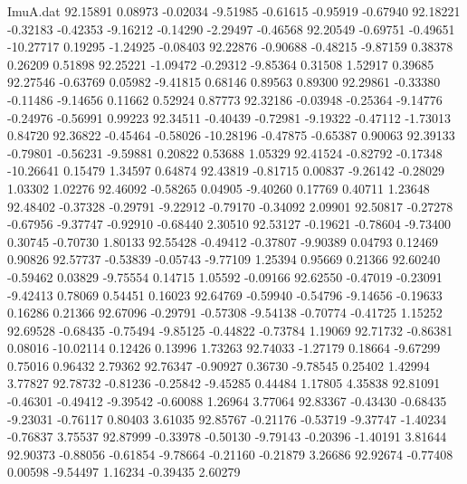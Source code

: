 \begin{filecontents}{ImuA.dat}
  92.15891    0.08973   -0.02034   -9.51985   -0.61615   -0.95919   -0.67940
  92.18221   -0.32183   -0.42353   -9.16212   -0.14290   -2.29497   -0.46568
  92.20549   -0.69751   -0.49651  -10.27717    0.19295   -1.24925   -0.08403
  92.22876   -0.90688   -0.48215   -9.87159    0.38378    0.26209    0.51898
  92.25221   -1.09472   -0.29312   -9.85364    0.31508    1.52917    0.39685
  92.27546   -0.63769    0.05982   -9.41815    0.68146    0.89563    0.89300
  92.29861   -0.33380   -0.11486   -9.14656    0.11662    0.52924    0.87773
  92.32186   -0.03948   -0.25364   -9.14776   -0.24976   -0.56991    0.99223
  92.34511   -0.40439   -0.72981   -9.19322   -0.47112   -1.73013    0.84720
  92.36822   -0.45464   -0.58026  -10.28196   -0.47875   -0.65387    0.90063
  92.39133   -0.79801   -0.56231   -9.59881    0.20822    0.53688    1.05329
  92.41524   -0.82792   -0.17348  -10.26641    0.15479    1.34597    0.64874
  92.43819   -0.81715    0.00837   -9.26142   -0.28029    1.03302    1.02276
  92.46092   -0.58265    0.04905   -9.40260    0.17769    0.40711    1.23648
  92.48402   -0.37328   -0.29791   -9.22912   -0.79170   -0.34092    2.09901
  92.50817   -0.27278   -0.67956   -9.37747   -0.92910   -0.68440    2.30510
  92.53127   -0.19621   -0.78604   -9.73400    0.30745   -0.70730    1.80133
  92.55428   -0.49412   -0.37807   -9.90389    0.04793    0.12469    0.90826
  92.57737   -0.53839   -0.05743   -9.77109    1.25394    0.95669    0.21366
  92.60240   -0.59462    0.03829   -9.75554    0.14715    1.05592   -0.09166
  92.62550   -0.47019   -0.23091   -9.42413    0.78069    0.54451    0.16023
  92.64769   -0.59940   -0.54796   -9.14656   -0.19633    0.16286    0.21366
  92.67096   -0.29791   -0.57308   -9.54138   -0.70774   -0.41725    1.15252
  92.69528   -0.68435   -0.75494   -9.85125   -0.44822   -0.73784    1.19069
  92.71732   -0.86381    0.08016  -10.02114    0.12426    0.13996    1.73263
  92.74033   -1.27179    0.18664   -9.67299    0.75016    0.96432    2.79362
  92.76347   -0.90927    0.36730   -9.78545    0.25402    1.42994    3.77827
  92.78732   -0.81236   -0.25842   -9.45285    0.44484    1.17805    4.35838
  92.81091   -0.46301   -0.49412   -9.39542   -0.60088    1.26964    3.77064
  92.83367   -0.43430   -0.68435   -9.23031   -0.76117    0.80403    3.61035
  92.85767   -0.21176   -0.53719   -9.37747   -1.40234   -0.76837    3.75537
  92.87999   -0.33978   -0.50130   -9.79143   -0.20396   -1.40191    3.81644
  92.90373   -0.88056   -0.61854   -9.78664   -0.21160   -0.21879    3.26686
  92.92674   -0.77408    0.00598   -9.54497    1.16234   -0.39435    2.60279

\end{filecontents}
